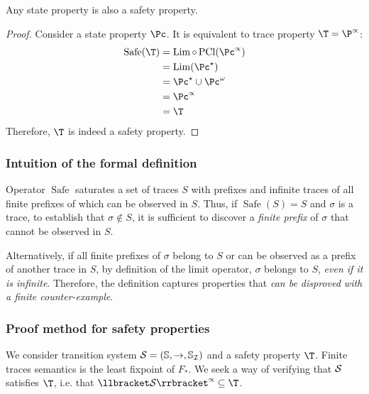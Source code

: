 \documentclass[toc, titlepaged]{../cs-classes/cs-classes}
\DeclareMathOperator{\pcl}{PCl}
\DeclareMathOperator{\Lim}{Lim}
\DeclareMathOperator{\safe}{Safe}
\begin{document}
\begin{theorem}
    Any state property is also a safety property.
\end{theorem}
\begin{proof}
    Consider a state property $\Pc$. It is equivalent to trace property $\T = \P^\propto$:
    \begin{equation*}
        \begin{aligned}
            \safe(\T) &= \Lim \circ \pcl (\Pc^\propto) \\
            &= \Lim(\Pc^\star) \\
            &= \Pc^\star \cup \Pc^\omega \\
            &= \Pc^\propto \\
            &= \T
        \end{aligned}
    \end{equation*}
    Therefore, $\T$ is indeed a safety property.
\end{proof}

\subsubsection{Intuition of the formal definition}
Operator $\safe$ saturates a set of traces $S$ with prefixes and infinite traces of all finite prefixes of which can be observed in $S$. Thus, if $\safe(S)=S$ and $\sigma$ is a trace, to establish that $\sigma\notin S$, it is sufficient to discover a \emph{finite prefix} of $\sigma$ that cannot be observed in $S$. 

Alternatively, if all finite prefixes of $\sigma$ belong to $S$ or can be observed as a prefix of another trace in $S$, by definition of the limit operator, $\sigma$ belongs to $S$, \emph{even if it is infinite}. Therefore, the definition captures properties that \emph{can be disproved with a finite counter-example}.

\subsubsection{Proof method for safety properties}
We consider transition system $\mathcal{S}=(\mathbb{S},\to,\mathbb{S}_{\mathcal{I}})$ and a safety property $\T$. Finite traces semantics is the least fixpoint of $F_*$. We seek a way of verifying that $\mathcal{S}$ satisfies $\T$, i.e. that $\llbracket \Sc\rrbracket^\propto\subseteq\T$.
\end{document}
